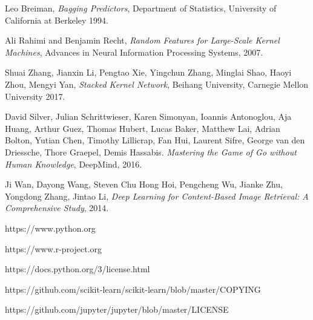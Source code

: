 \documentclass{article}
\begin{document}
\begin{thebibliography}{20}


Leo Breiman,
\textit{Bagging Predictors},
Department of Statistics, University of California at Berkeley
1994.

Ali Rahimi and Benjamin Recht,
\textit{Random Features for Large-Scale Kernel Machines},
Advances in Neural Information Processing Systems,
2007.

Shuai Zhang, Jianxin Li, Pengtao Xie, Yingchun Zhang, Minglai Shao, Haoyi Zhou, Mengyi Yan,
\textit{Stacked Kernel Network},
Beihang University, Carnegie Mellon University
2017.

David Silver, Julian Schrittwieser, Karen Simonyan, Ioannis Antonoglou, Aja Huang, Arthur
Guez, Thomas Hubert, Lucas Baker, Matthew Lai, Adrian Bolton, Yutian Chen, Timothy
Lillicrap, Fan Hui, Laurent Sifre, George van den Driessche, Thore Graepel, Demis Hassabis.
\textit{Mastering the Game of Go without Human Knowledge},
DeepMind,
2016.

Ji Wan, Dayong Wang, Steven Chu Hong Hoi, Pengcheng Wu, Jianke Zhu, Yongdong Zhang, Jintao Li,
\textit{Deep Learning for Content-Based Image Retrieval: A Comprehensive Study},
2014.

https://www.python.org

https://www.r-project.org

https://docs.python.org/3/license.html

https://github.com/scikit-learn/scikit-learn/blob/master/COPYING

https://github.com/jupyter/jupyter/blob/master/LICENSE

\end{thebibliography}
\end{document}
